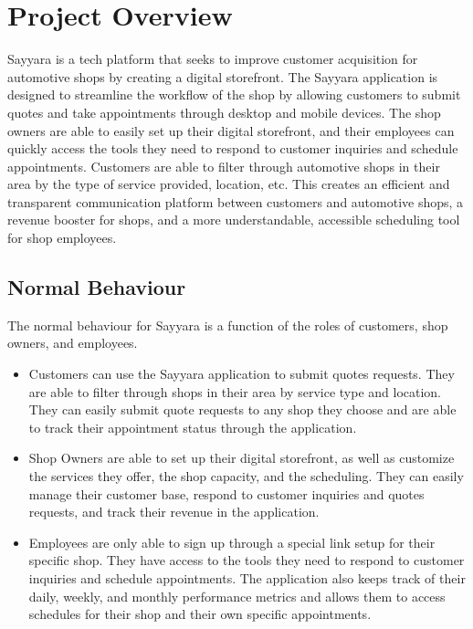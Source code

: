 \documentclass[12pt, titlepage]{article}
\begin{document}
\section{Project Overview}

Sayyara is a tech platform that seeks to improve customer acquisition for automotive shops by creating a digital storefront. The Sayyara application is designed to streamline the workflow of the shop by allowing customers to submit quotes and take appointments through desktop and mobile devices. The shop owners are able to easily set up their digital storefront, and their employees can quickly access the tools they need to respond to customer inquiries and schedule appointments. Customers are able to filter through automotive shops in their area by the type of service provided, location, etc. This creates an efficient and transparent communication platform between customers and automotive shops, a revenue booster for shops, and a more understandable, accessible scheduling tool for shop employees.

\subsection{Normal Behaviour}
The normal behaviour for Sayyara is a function of the roles of customers, shop owners, and employees.

\begin{itemize}
    \item Customers can use the Sayyara application to submit quotes requests. They are able to filter through shops in their area by service type and location. They can easily submit quote requests to any shop they choose and are able to track their appointment status through the application. 

    \item Shop Owners are able to set up their digital storefront, as well as customize the services they offer, the shop capacity, and the scheduling. They can easily manage their customer base, respond to customer inquiries and quotes requests, and track their revenue in the application.

    \item Employees are only able to sign up through a special link setup for their specific shop. They have access to the tools they need to respond to customer inquiries and schedule appointments. The application also keeps track of their daily, weekly, and monthly performance metrics and allows them to access schedules for their shop and their own specific appointments. 

\end{itemize}
\end{document}
